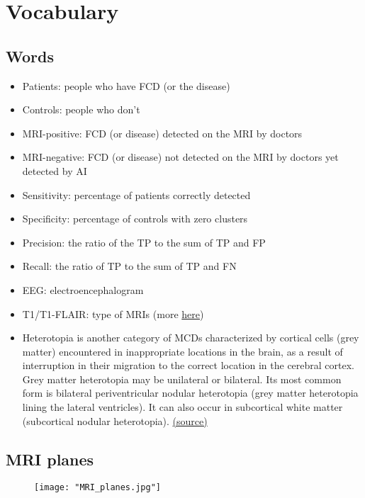 \chapter{Vocabulary}

\section{Words}

\begin{itemize}
	\item Patients: people who have FCD (or the disease)
	\item Controls: people who don't
	\item MRI-positive: FCD (or disease) detected on the MRI by doctors
	\item MRI-negative: FCD (or disease) not detected on the MRI by doctors yet detected by AI
	\item Sensitivity: percentage of patients correctly detected
	\item Specificity: percentage of controls with zero clusters
	\item Precision: the ratio of the TP to the sum of TP and FP
	\item Recall: the ratio of TP to the sum of TP and FN
	\item EEG: electroencephalogram
	\item T1/T1-FLAIR: type of MRIs (more \href{https://mriquestions.com/t1-flair.html}{here})
	\item Heterotopia is another category of MCDs characterized by cortical cells (grey matter) encountered in inappropriate locations in the brain, as a result of interruption in their migration to the correct location in the cerebral cortex. Grey matter heterotopia may be unilateral or bilateral. Its most common form is bilateral periventricular nodular heterotopia (grey matter heterotopia lining the lateral ventricles). It can also occur in subcortical white matter (subcortical nodular heterotopia). \href{https://hal.science/tel-02062210v2/file/these.pdf}{(source)}
\end{itemize}

\section{MRI planes}

\begin{figure}[htbp]
	\centering
	\texttt{[image: "MRI\_planes.jpg"]}
\end{figure}
